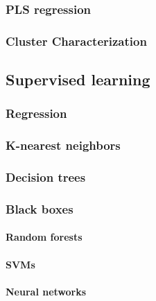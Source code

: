 \documentclass[
]{book}
\begin{document}
\hypertarget{pls-regression}{%
\subsubsection{PLS regression}\label{pls-regression}}

\hypertarget{cluster-characterization}{%
\subsubsection{Cluster Characterization}\label{cluster-characterization}}

\hypertarget{supervised-learning}{%
\subsection{Supervised learning}\label{supervised-learning}}

\hypertarget{regression}{%
\subsubsection{Regression}\label{regression}}

\hypertarget{k-nearest-neighbors}{%
\subsubsection{K-nearest neighbors}\label{k-nearest-neighbors}}

\hypertarget{decision-trees}{%
\subsubsection{Decision trees}\label{decision-trees}}

\hypertarget{black-boxes}{%
\subsubsection{Black boxes}\label{black-boxes}}

\hypertarget{random-forests}{%
\paragraph{Random forests}\label{random-forests}}

\hypertarget{svms}{%
\paragraph{SVMs}\label{svms}}

\hypertarget{neural-networks}{%
\paragraph{Neural networks}\label{neural-networks}}
\end{document}
